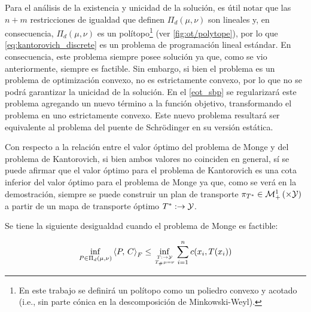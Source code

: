 Para el análisis de la existencia y unicidad de la solución, es útil notar que las $n+m$ restricciones de igualdad que definen $\Pi_d(\mu,\nu)$ son lineales y, en consecuencia, $\Pi_d(\mu,\nu)$ es un polítopo\footnote{En este trabajo se definirá un polítopo como un poliedro convexo y acotado (i.e., sin parte cónica en la descomposición de Minkowski-Weyl).} (ver \autoref{fig:ot/polytope}), por lo que \eqref{eq:kantorovich_discrete} es un problema de programación lineal estándar. En consecuencia, este problema siempre posee solución ya que, como se vio anteriormente, siempre es factible. Sin embargo, si bien el problema es un problema de optimización convexo, no es estrictamente convexo, por lo que no se podrá garantizar la unicidad de la solución. En el \autoref{eot_sbp} se regularizará este problema agregando un nuevo término a la función objetivo, transformando el problema en uno estrictamente convexo. Este nuevo problema resultará ser equivalente al problema del puente de Schrödinger en su versión estática.


Con respecto a la relación entre el valor óptimo del problema de Monge y del problema de Kantorovich, si bien ambos valores no coinciden en general, sí se puede afirmar que el valor óptimo para el problema de Kantorovich es una cota inferior del valor óptimo para el problema de Monge ya que, como se verá en la demostración, siempre se puede construir un plan de transporte $\pi_{T^*}\in\probmeasure{\xspace\times\yspace}$ a partir de un mapa de transporte óptimo $T^*:\to\mathcal{Y}$.

\begin{prop}
	Se tiene la siguiente desigualdad cuando el problema de Monge es factible:

	\begin{equation}
		\inf_{P\in \Pi_d(\mu,\nu)} \dotproduct{P}{C}_F
		\leq \inf_{\feasible{T:\xspace\to\yspace}{T_\#\mu=\nu}}
		\sum_{i=1}^n c(x_i,T(x_i))
	\end{equation}
\end{prop}

